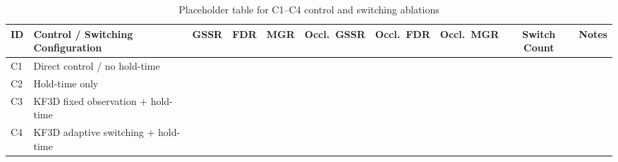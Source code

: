 \documentclass[pdflatex,sn-mathphys-num]{sn-jnl}%
\theoremstyle{thmstyleone}%
\theoremstyle{thmstyletwo}%
\theoremstyle{thmstylethree}%
\begin{document}
\begin{appendices}
\begin{table}[h]
\centering
\caption{Placeholder table for C1--C4 control and switching ablations}
\label{tab:appendix_c_ablation}
\begin{tabular}{llcccccccc}
\hline
\textbf{ID} & \textbf{Control / Switching Configuration}
  & \textbf{GSSR}
  & \textbf{FDR}
  & \textbf{MGR}
  & \textbf{Occl.\ GSSR}
  & \textbf{Occl.\ FDR}
  & \textbf{Occl.\ MGR}
  & \textbf{Switch Count}
  & \textbf{Notes} \\
\hline
C1 & Direct control / no hold-time                 &  &  &  &  &  &  &  &  \\
C2 & Hold-time only                                &  &  &  &  &  &  &  &  \\
C3 & KF3D fixed observation + hold-time            &  &  &  &  &  &  &  &  \\
C4 & KF3D adaptive switching + hold-time           &  &  &  &  &  &  &  &  \\
\hline
\end{tabular}
\end{table}

\end{appendices}
\fi





\end{document}

